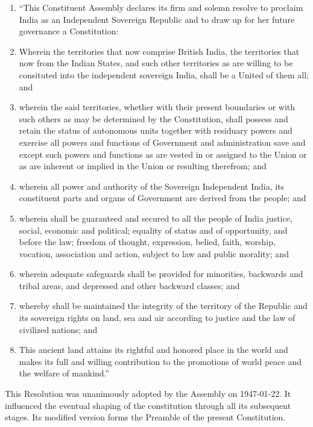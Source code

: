 \begin{enumerate}
  \item \textquotedblleft This Constituent Assembly declares its firm and solemn resolve to proclaim India as an Independent Sovereign Republic and to draw up for her future governance a Constitution:
  \item Wherein the territories that now comprise British India, the territories that now from the Indian States, and such other territories as are willing to be consituted into the independent sovereign India, shall be a United of them all; and
  \item wherein the said territories, whether with their present boundaries or with such others as may be determined by the Constitution, shall possess and retain the status of autonomous units together with residuary powers and exercise all powers and functions of Government and administration save and except such powers and functions as are vested in or assigned to the Union or as are inherent or implied in the Union or resulting therefrom; and
  \item wherein all power and authority of the Sovereign Independent India, its constituent parts and organs of Government are derived from the people; and
  \item wherein shall be guaranteed and secured to all the people of India justice, social, economic and political; equality of status and of opportunity, and before the law; freedom of thought, expression, belied, faith, worship, vocation, association and action, subject to law and public morality; and
  \item wherein adequate safeguards shall be provided for minorities, backwards and tribal areas, and depressed and other backward classes; and
  \item whereby shall be maintained the integrity of the territory of the Republic and its sovereign rights on land, sea and air according to justice and the law of civilized nations; and
  \item This ancient land attains its rightful and honored place in the world and makes its full and willing contribution to the promotions of world peace and the welfare of mankind.\textquotedblright
  
\end{enumerate}

This Resolution was unanimously adopted by the Assembly on 1947-01-22. It influenced the eventual shaping of the constitution through all its subsequent stages. Its modified version forms the Preamble of the present Constitution.

